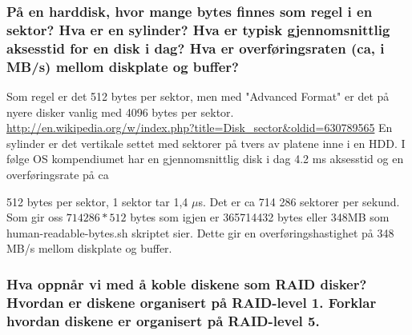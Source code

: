\documentclass[11pt]{article}
\begin{document}


\subsubsection{På en harddisk, hvor mange bytes finnes som regel i en sektor? Hva er en sylinder? Hva er typisk gjennomsnittlig aksesstid for en disk i dag? Hva er overføringsraten (ca, i MB/s) mellom diskplate og buffer?}

Som regel er det 512 bytes per sektor, men med "Advanced Format" er det på nyere disker vanlig med 4096 bytes per sektor. \url{http://en.wikipedia.org/w/index.php?title=Disk_sector&oldid=630789565}
En sylinder er det vertikale settet med sektorer på tvers av platene inne i en HDD.
I følge OS kompendiumet har en gjennomsnittlig disk i dag 4.2 ms aksesstid og en overføringsrate på ca 

512 bytes per sektor, 1 sektor tar 1,4 $\mu$s. Det er ca 714 286 sektorer per sekund. Som gir oss $714 286 * 512$ bytes som igjen er 365714432 bytes eller 348MB som human-readable-bytes.sh skriptet sier. Dette gir en overføringshastighet på 348 MB/s mellom diskplate og buffer.

\subsubsection{Hva oppnår vi med å koble diskene som RAID disker? Hvordan er diskene organisert på RAID-level 1. Forklar hvordan diskene er organisert på RAID-level 5.}
\end{document}
